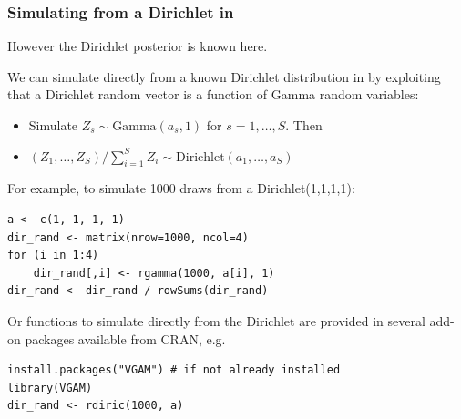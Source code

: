\begin{frame}[fragile]

  \frametitle{Simulating from a Dirichlet in \R}

  However the Dirichlet posterior is known here. 

  We can simulate directly from a known Dirichlet distribution in \R by
  exploiting that a Dirichlet random vector is a function of Gamma
  random variables:
  \begin{itemize}
  \item Simulate $Z_s \sim \mbox{Gamma}(a_s, 1)$ for $s=1, \ldots, S$. Then
  \item $(Z_1, \ldots,  Z_S) / \sum_{i=1}^S Z_i \sim \mbox{Dirichlet} (a_1,\ldots,a_S)$
  \end{itemize}

  \pause
  
  For example, to simulate 1000 draws from a Dirichlet(1,1,1,1):

  {\footnotesize \olive
\begin{verbatim}
a <- c(1, 1, 1, 1)
dir_rand <- matrix(nrow=1000, ncol=4)
for (i in 1:4)
    dir_rand[,i] <- rgamma(1000, a[i], 1)
dir_rand <- dir_rand / rowSums(dir_rand)
\end{verbatim}
  }

  \pause
  
  Or functions to simulate directly from the Dirichlet are provided in several \R add-on packages available from CRAN, e.g.

  {\footnotesize \olive
\begin{verbatim}
install.packages("VGAM") # if not already installed
library(VGAM)
dir_rand <- rdiric(1000, a)
\end{verbatim}
}
  
\end{frame}



